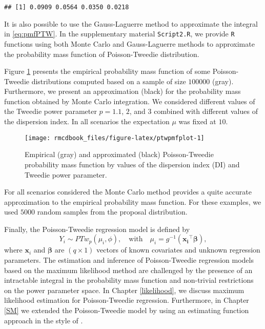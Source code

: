 \documentclass[9pt,a5paper,]{book}
\theoremstyle{definition}
\theoremstyle{definition}
\theoremstyle{remark}
\begin{document}
\begin{verbatim}
## [1] 0.0909 0.0564 0.0350 0.0218
\end{verbatim}

It is also possible to use the Gauss-Laguerre method to approximate the
integral in \eqref{eq:pmfPTW}. In the supplementary material
\texttt{Script2.R}, we provide \texttt{R} functions using both Monte
Carlo and Gauss-Laguerre methods to approximate the probability mass
function of Poisson-Tweedie distribution.

Figure \ref{fig:ptwpmfplot} presents the empirical probability mass
function of some Poisson-Tweedie distributions computed based on a
sample of size \(100000\) (gray). Furthermore, we present an
approximation (black) for the probability mass function obtained by
Monte Carlo integration. We considered different values of the Tweedie
power parameter \(p = 1.1\), \(2\), and \(3\) combined with different
values of the dispersion index. In all scenarios the expectation \(\mu\)
was fixed at \(10\).

\begin{figure}[h]

{\centering \texttt{[image: rmcdbook\_files/figure-latex/ptwpmfplot-1]} 

}

\caption{Empirical (gray) and approximated (black) Poisson-Tweedie probability mass function by values of the dispersion index (DI) and Tweedie power parameter.}\label{fig:ptwpmfplot}
\end{figure}

For all scenarios considered the Monte Carlo method provides a quite
accurate approximation to the empirical probability mass function. For
these examples, we used \(5000\) random samples from the proposal
distribution.

Finally, the Poisson-Tweedie regression model is defined by
\[Y_i \sim PTw_{p}(\mu_i, \phi), \quad  \text{with} \quad \mu_i = g^{-1}(\boldsymbol{x_i}^{\top} \boldsymbol{\beta}),\]
where \(\boldsymbol{x}_i\) and \(\boldsymbol{\beta}\) are
\((q \times 1)\) vectors of known covariates and unknown regression
parameters. The estimation and inference of Poisson-Tweedie regression
models based on the maximum likelihood method are challenged by the
presence of an intractable integral in the probability mass function and
non-trivial restrictions on the power parameter space. In Chapter
\ref{likelihood}, we discuss maximum likelihood estimation for
Poisson-Tweedie regression. Furthermore, in Chapter \ref{SM} we extended
the Poisson-Tweedie model by using an estimating function approach in
the style of \citet{Wedderburn1974}.
\end{document}
